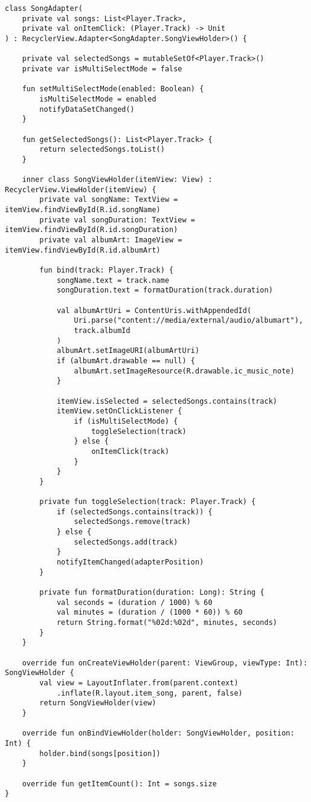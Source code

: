 \begin{verbatim}
class SongAdapter(
    private val songs: List<Player.Track>,
    private val onItemClick: (Player.Track) -> Unit
) : RecyclerView.Adapter<SongAdapter.SongViewHolder>() {

    private val selectedSongs = mutableSetOf<Player.Track>()
    private var isMultiSelectMode = false

    fun setMultiSelectMode(enabled: Boolean) {
        isMultiSelectMode = enabled
        notifyDataSetChanged()
    }

    fun getSelectedSongs(): List<Player.Track> {
        return selectedSongs.toList()
    }

    inner class SongViewHolder(itemView: View) : RecyclerView.ViewHolder(itemView) {
        private val songName: TextView = itemView.findViewById(R.id.songName)
        private val songDuration: TextView = itemView.findViewById(R.id.songDuration)
        private val albumArt: ImageView = itemView.findViewById(R.id.albumArt)

        fun bind(track: Player.Track) {
            songName.text = track.name
            songDuration.text = formatDuration(track.duration)

            val albumArtUri = ContentUris.withAppendedId(
                Uri.parse("content://media/external/audio/albumart"),
                track.albumId
            )
            albumArt.setImageURI(albumArtUri)
            if (albumArt.drawable == null) {
                albumArt.setImageResource(R.drawable.ic_music_note)
            }

            itemView.isSelected = selectedSongs.contains(track)
            itemView.setOnClickListener {
                if (isMultiSelectMode) {
                    toggleSelection(track)
                } else {
                    onItemClick(track)
                }
            }
        }

        private fun toggleSelection(track: Player.Track) {
            if (selectedSongs.contains(track)) {
                selectedSongs.remove(track)
            } else {
                selectedSongs.add(track)
            }
            notifyItemChanged(adapterPosition)
        }

        private fun formatDuration(duration: Long): String {
            val seconds = (duration / 1000) % 60
            val minutes = (duration / (1000 * 60)) % 60
            return String.format("%02d:%02d", minutes, seconds)
        }
    }

    override fun onCreateViewHolder(parent: ViewGroup, viewType: Int): SongViewHolder {
        val view = LayoutInflater.from(parent.context)
            .inflate(R.layout.item_song, parent, false)
        return SongViewHolder(view)
    }

    override fun onBindViewHolder(holder: SongViewHolder, position: Int) {
        holder.bind(songs[position])
    }

    override fun getItemCount(): Int = songs.size
}
\end{verbatim}



\endinput